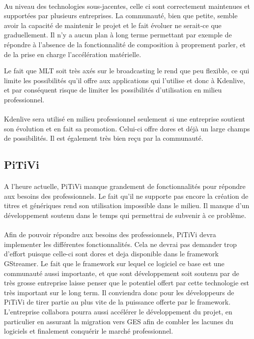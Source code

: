 \paragraph{}

Au niveau des technologies sous-jacentes, celle ci sont correctement
maintenues et supportées par plusieurs entreprises. La communauté,
bien que petite, semble avoir la capacité de maintenir le projet et
le fait évoluer ne serait-ce que graduellement. Il n'y a aucun plan
à long terme permettant par exemple de répondre à l'absence de la
fonctionnalité de composition à proprement parler, et de la prise en
charge l'accélération matérielle.

Le fait que MLT soit très axés sur le broadcasting le rend que peu
flexible, ce qui limite les possibilités qu'il offre aux applications
qui l'utilise et donc à Kdenlive, et par conséquent risque de limiter
les possibilités d'utilisation en milieu professionnel.

\paragraph{}

Kdenlive sera utilisé en milieu professionnel seulement si une entreprise
soutient son évolution et en fait sa promotion. Celui-ci offre dores
et déjà un large champs de possibilités. Il est également très bien
reçu par la communauté.

\subsection {PiTiVi}

\paragraph{}

A l'heure actuelle, PiTiVi manque grandement de fonctionnalités pour
répondre aux besoins des professionnels. Le fait qu'il ne supporte
pas encore la création de titres et génériques rend son utilisation
impossible dans le milieu. Il manque d'un développement soutenu dans
le temps qui permettrai de subvenir à ce problème.

\paragraph{}

Afin de pouvoir répondre aux besoins des professionnels, PiTiVi devra
implementer les différentes fonctionnalités. Cela ne devrai pas demander
trop d'effort puisque celle-ci sont dores et deja disponible dans le
framework GStreamer. Le fait que le framework sur lequel ce logiciel ce
base est une communauté aussi importante, et que sont développement soit
soutenu par de très grosse entreprise laisse penser que le potentiel
offert par cette technologie est très important sur le long term. Il
conviendra donc pour les développeurs de PiTiVi de tirer partie au plus
vite de la puissance offerte par le framework.  L'entreprise collabora
pourra aussi accélérer le développement du projet, en particulier en
assurant la migration vers GES afin de combler les lacunes du logiciels
et finalement conquérir le marché professionnel.
